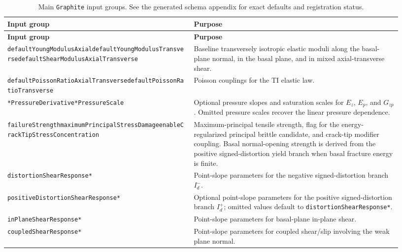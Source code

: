 \begingroup
\footnotesize
\begin{longtable}{>{\raggedright\arraybackslash}p{0.44\linewidth}>{\raggedright\arraybackslash}p{0.49\linewidth}}
\caption{Main \texttt{Graphite} input groups.  See the generated schema appendix for exact defaults and registration status.\label{tab:graphite-parameters}}\\
\toprule
\textbf{Input group} & \textbf{Purpose}\\
\midrule
\endfirsthead
\toprule
\textbf{Input group} & \textbf{Purpose}\\
\midrule
\endhead
\texttt{defaultYoungModulusAxial}\newline \texttt{defaultYoungModulusTransverse}\newline \texttt{defaultShearModulusAxialTransverse} & Baseline transversely isotropic elastic moduli along the basal-plane normal, in the basal plane, and in mixed axial-transverse shear.\\
\texttt{defaultPoissonRatioAxialTransverse}\newline \texttt{defaultPoissonRatioTransverse} & Poisson couplings for the TI elastic law.\\
\texttt{*PressureDerivative}\newline \texttt{*PressureScale} & Optional pressure slopes and saturation scales for \(E_z\), \(E_p\), and \(G_{zp}\).  Omitted pressure scales recover the linear pressure dependence.\\
\texttt{failureStrength}\newline \texttt{maximumPrincipalStressDamage}\newline \texttt{enableCrackTipStressConcentration} & Maximum-principal tensile strength, flag for the energy-regularized principal brittle candidate, and crack-tip modifier coupling.  Basal normal-opening strength is derived from the positive signed-distortion yield branch when basal fracture energy is finite.\\
\texttt{distortionShearResponse*} & Point-slope parameters for the negative signed-distortion branch \(I_d^-\).\\
\texttt{positiveDistortionShearResponse*} & Optional point-slope parameters for the positive signed-distortion branch \(I_d^+\); omitted values default to \texttt{distortionShearResponse*}.\\
\texttt{inPlaneShearResponse*} & Point-slope parameters for basal-plane in-plane shear.\\
\texttt{coupledShearResponse*} & Point-slope parameters for coupled shear/slip involving the weak plane normal.\\

\end{longtable}
